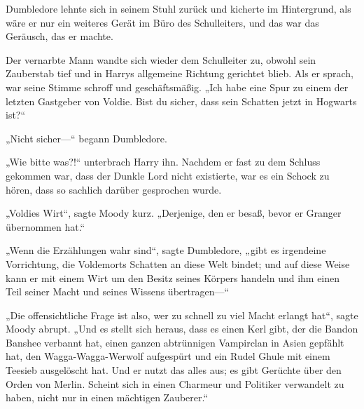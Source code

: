 Dumbledore lehnte sich in seinem Stuhl zurück und kicherte im Hintergrund, als wäre er nur ein weiteres Gerät im Büro des Schulleiters, und das war das Geräusch, das er machte.

Der vernarbte Mann wandte sich wieder dem Schulleiter zu, obwohl sein Zauberstab tief und in Harrys allgemeine Richtung gerichtet blieb. Als er sprach, war seine Stimme schroff und geschäftsmäßig.
„Ich habe eine Spur zu einem der letzten Gastgeber von Voldie. Bist du sicher, dass sein Schatten jetzt in Hogwarts ist?“

„Nicht sicher—“ begann Dumbledore.

„Wie bitte was?!“ unterbrach Harry ihn.
Nachdem er fast zu dem Schluss gekommen war, dass der Dunkle Lord nicht existierte, war es ein Schock zu hören, dass so sachlich darüber gesprochen wurde.

„Voldies Wirt“, sagte Moody kurz. „Derjenige, den er besaß, bevor er Granger übernommen hat.“

„Wenn die Erzählungen wahr sind“, sagte Dumbledore, „gibt es irgendeine Vorrichtung, die Voldemorts Schatten an diese Welt bindet; und auf diese Weise kann er mit einem Wirt um den Besitz seines Körpers handeln und ihm einen Teil seiner Macht und seines Wissens übertragen—“

„Die offensichtliche Frage ist also, wer zu schnell zu viel Macht erlangt hat“, sagte Moody abrupt. „Und es stellt sich heraus, dass es einen Kerl gibt, der die Bandon Banshee verbannt hat, einen ganzen abtrünnigen Vampirclan in Asien gepfählt hat, den Wagga-Wagga-Werwolf aufgespürt und ein Rudel Ghule mit einem Teesieb ausgelöscht hat. Und er nutzt das alles aus; es gibt Gerüchte über den Orden von Merlin. Scheint sich in einen Charmeur und Politiker verwandelt zu haben, nicht nur in einen mächtigen Zauberer.“

